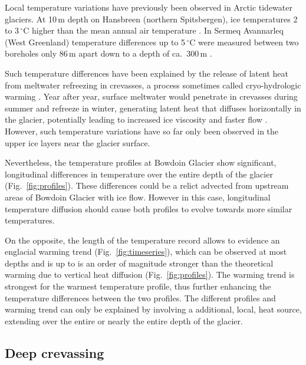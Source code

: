 \documentclass[utf8]{article}
\begin{document}
    Local temperature variations have previously been observed in Arctic
    tidewater glaciers. At 10\,m depth on Hansbreen (northern Spitsbergen),
    ice temperatures 2 to 3\,$^\circ$C higher than the mean annual air
    temperature \citep{Jania.etal.1996}. In Sermeq Avannarleq (West Greenland)
    temperature differences up to 5\,$^\circ$C were measured between two
    boreholes only 86\,m apart down to a depth of ca.~300\,m
    \citep{Luthi.etal.2015}.

    Such temperature differences have been explained by the release of latent
    heat from meltwater refreezing in crevasses, a process sometimes called
    cryo-hydrologic warming \citep{Phillips.etal.2010}. Year after year,
    surface meltwater would penetrate in crevasses during summer and refreeze
    in winter, generating latent heat that diffuses horizontally in the
    glacier, potentially leading to increased ice viscosity and faster flow
    \citep{Phillips.etal.2013}.  However, such temperature variations have so
    far only been observed in the upper ice layers near the glacier surface.

    Nevertheless, the temperature profiles at Bowdoin Glacier show significant,
    longitudinal differences in temperature over the entire depth of the
    glacier (Fig.~\ref{fig:profiles}). These differences could be a relict
    advected from upstream areas
    of Bowdoin Glacier with ice flow. However in this case, longitudinal
    temperature diffusion should cause both profiles to evolve towards more
    similar temperatures.

    On the opposite, the length of the temperature record allows to evidence an
    englacial warming trend (Fig.~\ref{fig:timeseries}), which can be observed
    at most depths and is up to is an order of magnitude stronger than the
    theoretical warming due to vertical heat diffusion
    (Fig.~\ref{fig:profiles}). The warming trend is strongest for the warmest
    temperature profile, thus further enhancing the temperature differences
    between the two profiles. The different profiles and warming trend can only
    be explained by involving a additional, local, heat source, extending over
    the entire or nearly the entire depth of the glacier.


\subsection{Deep crevassing}
\end{document}
